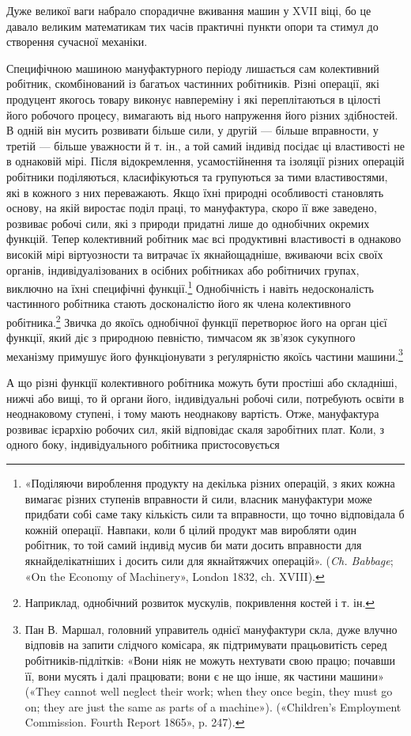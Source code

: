 \parcont{}  %
Дуже великої ваги набрало спорадичне вживання машин у
XVII віці, бо це давало великим математикам тих часів практичні
пункти опори та стимул до створення сучасної механіки.

Специфічною машиною мануфактурного періоду лишається
сам колективний робітник, скомбінований із багатьох частинних
робітників. Різні операції, які продуцент якогось товару виконує
навпереміну і які переплітаються в цілості його робочого процесу,
вимагають від нього напруження його різних здібностей.
В одній він мусить розвивати більше сили, у другій — більше
вправности, у третій — більше уважности й т. ін., а той самий
індивід посідає ці властивості не в однаковій мірі. Після відокремлення,
усамостійнення та ізоляції різних операцій робітники
поділяються, класифікуються та групуються за тими властивостями,
які в кожного з них переважають. Якщо їхні природні
особливості становлять основу, на якій виростає поділ праці,
то мануфактура, скоро її вже заведено, розвиває робочі сили, які
з природи придатні лише до однобічних окремих функцій. Тепер
колективний робітник має всі продуктивні властивості в однаково
високій мірі віртуозности та витрачає їх якнайощадніше, вживаючи
всіх своїх органів, індивідуалізованих в осібних робітниках
або робітничих групах, виключно на їхні специфічні функції.\footnote{
«Поділяючи вироблення продукту на декілька різних операцій,
з яких кожна вимагає різних ступенів вправности й сили, власник мануфактури
може придбати собі саме таку кількість сили та вправности,
що точно відповідала б кожній операції. Навпаки, коли б цілий продукт
мав виробляти один робітник, то той самий індивід мусив би мати досить
вправности для якнайделікатніших і досить сили для якнайтяжчих
операцій». (\emph{Ch. Babbage}; «On the Economy of Machinery», London 1832,
ch. XVIII).
} Однобічність і навіть недосконалість частинного робітника стають
досконалістю його як члена колективного робітника.\footnote{
Наприклад, однобічний розвиток мускулів, покривлення костей
і т. ін.
} Звичка до якоїсь однобічної функції перетворює його на орган цієї
функції, який діє з природною певністю, тимчасом як зв’язок
сукупного механізму примушує його функціонувати з реґулярністю
якоїсь частини машини.\footnote{
Пан В. Маршал, головний управитель однієї мануфактури скла,
дуже влучно відповів на запити слідчого комісара, як підтримувати
працьовитість серед робітників-підлітків: «Вони ніяк не можуть нехтувати
свою працю; почавши її, вони мусять і далі працювати; вони
є не що інше, як частини машини» («They cannot well neglect their work;
when they once begin, they must go on; they are just the same as parts of
a machine»). («Children’s Employment Commission. Fourth Report 1865»,
p. 247).
}

А що різні функції колективного робітника можуть бути
простіші або складніші, нижчі або вищі, то й органи його, індивідуальні
робочі сили, потребують освіти в неоднаковому ступені,
і тому мають неоднакову вартість. Отже, мануфактура розвиває
ієрархію робочих сил, якій відповідає скаля заробітних плат.
Коли, з одного боку, індивідуального робітника пристосовується
\parbreak{}  %
